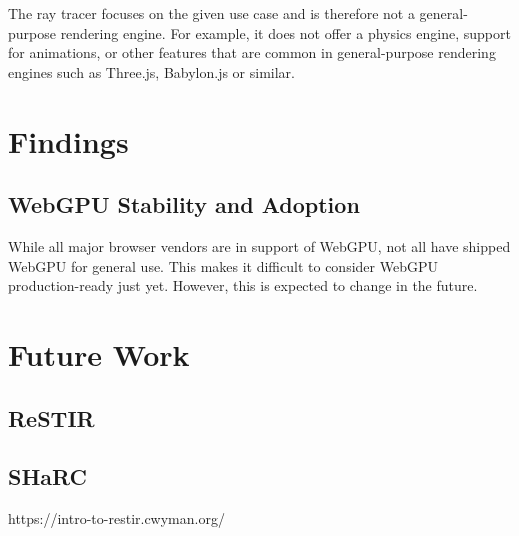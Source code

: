 
The ray tracer focuses on the given use case and is therefore not a general-purpose rendering engine. For example, it does not offer a physics engine, support for animations, or other features that are common in general-purpose rendering engines such as Three.js, Babylon.js or similar.

\section{Findings}
\subsection{WebGPU Stability and Adoption}

While all major browser vendors are in support of WebGPU, not all have shipped WebGPU for general use. This makes it difficult to consider WebGPU production-ready just yet. However, this is expected to change in the future.

\section{Future Work}
\subsection{ReSTIR}
\subsection{SHaRC}

https://intro-to-restir.cwyman.org/